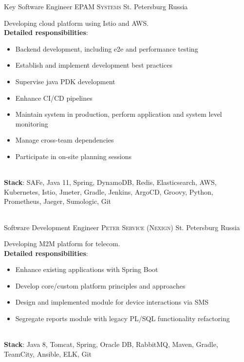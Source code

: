 \documentclass[11pt,a4paper,sans]{moderncv}
\begin{document}
    {Key Software Engineer}
    {\textsc{EPAM Systems}}
    {St. Petersburg}
    {Russia}
    {
        Developing cloud platform using Istio and AWS. 
        \\
        \textbf{Detailed responsibilities}:
        \begin{itemize}
            \item Backend development, including e2e and performance testing
            \item Establish and implement development best practices
            \item Supervise java PDK development
            \item Enhance CI/CD pipelines
            \item Maintain system in production, perform application and system level monitoring
            \item Manage cross-team dependencies
            \item Participate in on-site planning sessions
        \end{itemize}
        \\ 
        \textbf{Stack}: SAFe, Java 11, Spring, DynamoDB, Redis, Elasticsearch, AWS, Kubernetes, Istio, Jmeter, Gradle, Jenkins, ArgoCD, Groovy, Python, Prometheus, Jaeger, Sumologic, Git
    }
    
\hfill \\

    {Software Development Engineer}
    {\textsc{Peter Service (Nexign)}}
    {St. Petersburg}
    {Russia}
    {
        Developing M2M platform for telecom.
        \\
        \textbf{Detailed responsibilities}:
        \begin{itemize}
            \item Enhance existing applications with Spring Boot
            \item Develop core/custom platform principles and approaches
            \item Design and implemented module for device interactions via SMS
            \item Segregate reports module with legacy PL/SQL functionality refactoring
        \end{itemize}
        \\ 
        \textbf{Stack}: Java 8, Tomcat, Spring, Oracle DB, RabbitMQ, Maven, Gradle, TeamCity, Ansible, ELK, Git
    }
    
\end{document}
